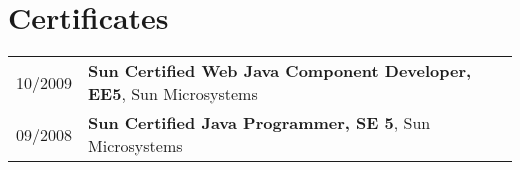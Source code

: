 \documentclass[2pt,a4paper]{article}
\newlength{\datecolumn}
\newlength{\textcolumn}
\begin{document}
\section*{Certificates}
\begin{tabular}{p{\datecolumn} p{\textcolumn}}
10/2009 & \textbf{Sun Certified Web Java Component Developer, EE5}, Sun Microsystems \\
09/2008 & \textbf{Sun Certified Java Programmer, SE 5}, Sun Microsystems \\
\end{tabular}
\end{document}
